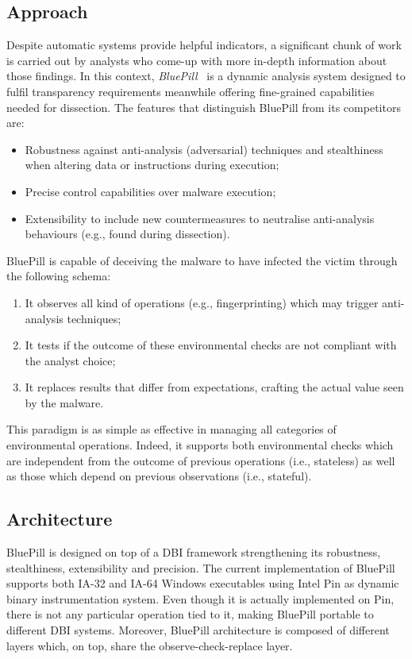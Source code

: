 \documentclass[LaM,binding=0.6cm]{sapthesis}
\begin{document}
\subsection{Approach}
Despite automatic systems provide helpful indicators, a significant chunk of work is carried out by analysts who come-up with more in-depth information about those findings. In this context, \textit{BluePill}~\cite{bho} is a dynamic analysis system designed to fulfil transparency requirements meanwhile offering fine-grained capabilities needed for dissection. The features that distinguish BluePill from its competitors are:
\begin{itemize}
\item Robustness against anti-analysis (adversarial) techniques and stealthiness when altering data or instructions during execution;
\item Precise control capabilities over malware execution;
\item Extensibility to include new countermeasures to neutralise anti-analysis behaviours (e.g., found during dissection).
\end{itemize}
\newpage
BluePill is capable of deceiving the malware to have infected the victim through the following schema:
\begin{enumerate}
\item It observes all kind of operations (e.g., fingerprinting) which may trigger anti-analysis techniques;
\item It tests if the outcome of these environmental checks are not compliant with the analyst choice;
\item It replaces results that differ from expectations, crafting the actual value seen by the malware.  
\end{enumerate}
This paradigm is as simple as effective in managing all categories of environmental operations. Indeed, it supports both environmental checks which are independent from the outcome of previous operations (i.e., stateless) as well as those which depend on previous observations (i.e., stateful).

\subsection{Architecture}
BluePill is designed on top of a DBI framework strengthening its robustness, stealthiness, extensibility and precision. The current implementation of BluePill supports both IA-32 and IA-64 Windows executables using Intel Pin as dynamic binary instrumentation system. Even though it is actually implemented on Pin, there is not any particular operation tied to it, making BluePill portable to different DBI systems. Moreover, BluePill architecture is composed of different layers which, on top, share the observe-check-replace layer.
\end{document}
